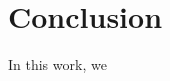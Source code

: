\documentclass[../main.tex]{subfiles}
\begin{document}
\chapter{Conclusion}
\label{ch:conclusion}

In this work, we
\end{document}

